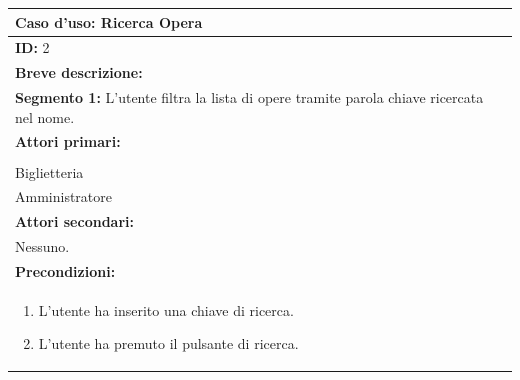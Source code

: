 \documentclass{article}
\begin{document}
                \begin{table}[H]
                    \begin{tabular}{|p{\linewidth}|}
                        \hline
                        \cellcolor{gray!100}
                        \color{white}
                        \centerline{\textbf{Caso d'uso:} Ricerca Opera} \\
                        \hline
                        \textbf{ID:} 2 \\
                        \hline
                        \cellcolor{gray!20}
                        \textbf{Breve descrizione:} \\
                        \cellcolor{gray!20}
                        \textbf{Segmento 1:} L'utente filtra la lista di opere tramite parola chiave ricercata nel nome. \\
                        \hline
                        \textbf{Attori primari:} \\
                        \begin{minipage}{\linewidth}
                            Cliente \\
                            Biglietteria \\
                            Amministratore
                        \end{minipage}
                        \vspace{0pt} \\  %
                        \hline
                        \textbf{Attori secondari:} \\
                        Nessuno. \\
                        \hline
                        \cellcolor{gray!20}
                        \textbf{Precondizioni:} \\
                        \cellcolor{gray!20}
                        \begin{minipage}{\linewidth}
                            \begin{enumerate}
                                \item L'utente ha inserito una chiave di ricerca.
                                \item L'utente ha premuto il pulsante di ricerca.
                            \end{enumerate}
                        \end{minipage} \\

\end{tabular}
\end{table}
\end{document}
